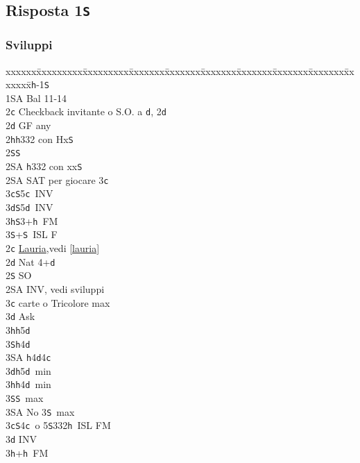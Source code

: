 \documentclass[a4paper,italian]{article}
\newcommand{\BS}{\small{\texttt{S}}}
\newcommand{\BC}{\small{\texttt{c}}}
\newcommand{\BD}{\small{\texttt{d}}}
\newcommand{\BH}{\small{\texttt{h}}}
\newcommand{\pdfs}{\texorpdfstring{\texttt{S}}{S}}
\newenvironment{bidtable}
{\begin{tabbing}

    xxxxxx\=xxxxxxxxx\=xxxxxxxxx\=xxxxxxx\=xxxxxxx\=xxxxxxx\=xxxxxxx\=xxxxxxx\=xxxxxxx\=xxxxxxx\=\kill}
{\end{tabbing} }%
\begin{document}
\begin{multicols*}{2}
    \subsection{Risposta 1\pdfs}

    \subsubsection{Sviluppi}

    \begin{bidtable}
        1\BH-1\BS\+\\
        1\small{SA} \> Bal 11-14\+\\
        2\BC \> Checkback invitante o S.O. a \BD , 2\BD \\
        2\BD \> GF any\+\\
        2\BH {}\BH 332 con Hx\BS \\
        2\BS {}\BS \\
        2\small{SA} \BH 332 con xx\BS \-\\
        2\small{SA} \small{SA}T per giocare 3\BC \\
        3\BC {}\BS 5\BC\ INV\\
        3\BD {}\BS 5\BD\ INV\\
        3\BH {}\BS 3+\BH\ FM\\
        3\BS {}+\BS\ ISL F\-\\
        2\BC \> \hyperref[lauria]{Lauria},vedi \ref{lauria}\\
        2\BD \> Nat 4+\BD\+\\
        2\BS \> SO\\
        2\small{SA} \> INV, vedi sviluppi\+\\
        3\BC {} carte o Tricolore max\+\\
        3\BD \> Ask\+\\
        3\BH {}\BH 5\BD \\
        3\BS {}\BH 4\BD \\
        3\small{SA} \BH 4\BD 4\BC \-\-\\
        3\BD {}\BH 5\BD\ min\\
        3\BH {}\BH 4\BD\ min\\
        3\BS {}\BS\ max\\
        3\small{SA} \> No 3\BS\ max\-\\
        3\BC {}\BS 4\BC\ o 5\BS 332\BH\ ISL FM\\
        3\BD \> INV\\
        3\BH {}+\BH\ FM\\

\end{bidtable}
\end{multicols*}
\end{document}
